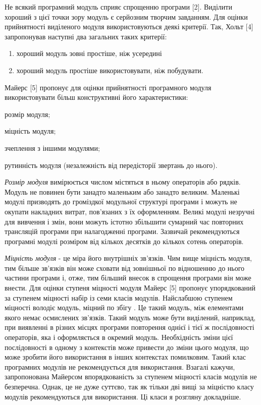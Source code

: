 \documentclass[a4paper,14pt, titlepage]{article}
\begin{document}
Не всякий програмний модуль сприяє спрощенню програми [2]. Виділити
хороший з цієї точки зору модуль є серйозним творчим завданням. Для
оцінки прийнятності виділеного модуля використовуються деякі критерії.
Так, Хольт [4] запропонував наступні два загальних таких критерії:
\begin{enumerate}
    \item хороший модуль зовні простіше, ніж усередині
    \item хороший модуль простіше використовувати, ніж побудувати.
\end{enumerate}

Майерс [5] пропонує для оцінки прийнятності програмного модуля
використовувати більш конструктивні його характеристики:
    \item розмір модуля;
    \item міцність модуля;
    \item зчеплення з іншими модулями;
    \item рутинність модуля (незалежність від передісторії звертань до нього).

\emph{Розмір модуля} вимірюється числом містяться в ньому операторів або
рядків. Модуль не повинен бути занадто маленьким або занадто великим.
Маленькі модулі призводять до громіздкої модульної структурі програми і
можуть не окупати накладних витрат, пов'язаних з їх оформленням. Великі
модулі незручні для вивчення і змін, вони можуть істотно збільшити
сумарний час повторних трансляцій програми при налагодженні програми.
Зазвичай рекомендуються програмні модулі розміром від кількох десятків
до кількох сотень операторів.

\emph{Міцність модуля} - це міра його внутрішніх зв'язків. Чим вище міцність
модуля, тим більше зв'язків він може сховати від зовнішньої по
відношенню до нього частини програми і, отже, тим більший внесок в
спрощення програми він може внести. Для оцінки ступеня міцності модуля
Майерс [5] пропонує упорядкований за ступенем міцності набір із семи
класів модулів. Найслабшою ступенем міцності володіє модуль, міцний по
збігу . Це такий модуль, між елементами якого немає осмислених зв'язків.
Такий модуль може бути виділений, наприклад, при виявленні в різних
місцях програми повторення однієї і тієї ж послідовності операторів, яка
і оформляється в окремий модуль. Необхідність зміни цієї послідовності в
одному з контекстів може привести до зміни цього модуля, що може зробити
його використання в інших контекстах помилковим. Такий клас програмних
модулів не рекомендується для використання. Взагалі кажучи,
запропонована Майерсом впорядкованість за ступенем міцності класів
модулів не безперечна. Однак, це не дуже суттєво, так як тільки дві вищі
за міцністю класу модулів рекомендуються для використання. Ці класи я
розгляну докладніше.
\end{document}
